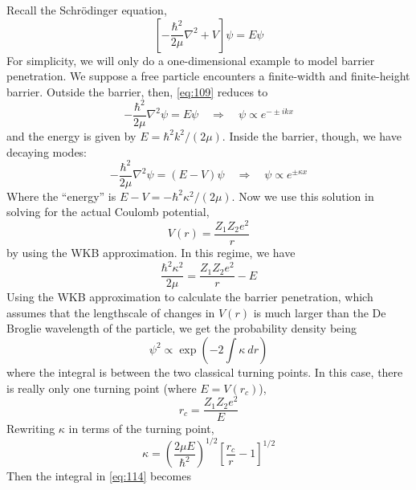 \documentclass[10pt]{article}
\numberwithin{equation}{section}
\begin{document}
  Recall the Schr\"odinger equation,
  \begin{equation}
    \label{eq:109}
    \left[-\frac{\hbar^2}{2\mu}\nabla^2+V\right]\psi=E\psi
  \end{equation}
  For simplicity, we will only do a one-dimensional example to model
  barrier penetration. We suppose a free particle encounters a
  finite-width and finite-height barrier. Outside the barrier, then,
  \eqref{eq:109} reduces to
  \begin{equation}
    \label{eq:110}
    -\frac{\hbar^2}{2\mu}\nabla^2\psi=E\psi\quad\Rightarrow\quad
    \psi\propto e^{-\pm ikx}
  \end{equation}
  and the energy is given by $E=\hbar^2k^2/(2\mu)$. Inside the
  barrier, though, we have decaying modes:
  \begin{equation}
    \label{eq:111}
    -\frac{\hbar^2}{2\mu}\nabla^2\psi=(E-V)\psi\quad\Rightarrow\quad
    \psi\propto e^{\pm\kappa x}
  \end{equation}
  Where the ``energy'' is $E-V=-\hbar^2\kappa^2/(2\mu)$. Now we use
  this solution in solving for the actual Coulomb potential,
  \begin{equation}
    \label{eq:112}
    V(r)=\frac{Z_1Z_2 e^2}{r}
  \end{equation}
  by using the WKB approximation. In this regime, we have
  \begin{equation}
    \label{eq:113}
    \frac{\hbar^2\kappa^2}{2\mu}=\frac{Z_1Z_2 e^2}{r}-E
  \end{equation}
  Using the WKB approximation to calculate the barrier penetration,
  which assumes that the lengthscale of changes in $V(r)$ is much
  larger than the De Broglie wavelength of the particle, we get the
  probability density being
  \begin{equation}
    \label{eq:114}
    \psi^2\propto \exp\left(-2\int \kappa\ dr\right)
  \end{equation}
  where the integral is between the two classical turning points. In
  this case, there is really only one turning point (where $E=V(r_c)$),
  \begin{equation}
    \label{eq:115}
    r_c=\frac{Z_1Z_2 e^2}{E}
  \end{equation}
  Rewriting $\kappa$ in terms of the turning point,
  \begin{equation}
    \label{eq:116}
    \kappa = \left(\frac{2\mu E}{\hbar^2}\right)^{1/2}\left[\frac{r_c}
{r}-1\right]^{1/2}
  \end{equation}
  Then the integral in \eqref{eq:114} becomes
\end{document}
